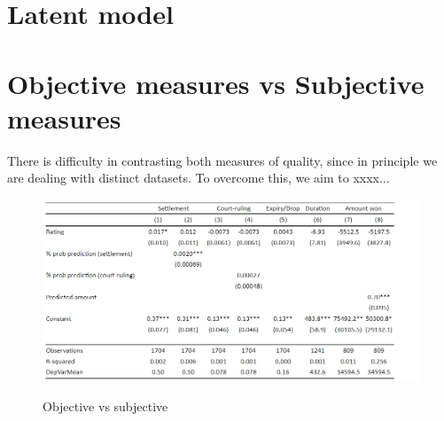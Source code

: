\documentclass[oneside,11pt]{article}
\begin{document}
\section{Latent model}

\section{Objective measures vs Subjective measures}


There is difficulty in contrasting both measures of quality, since in principle we are dealing with distinct datasets. To overcome this, we aim to xxxx...

\begin{figure}[H]%
 \centering
 \caption{Objective vs subjective}
 \includegraphics[width=\textwidth]{Figuras/obj_vs_sub.png}
 \label{fig:3}
\end{figure}










\clearpage

\onehalfspacing






\clearpage








\clearpage
\end{document}
